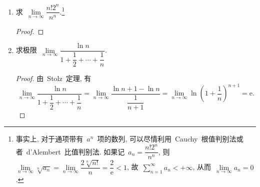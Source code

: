 \documentclass[UTF8,a4paper,11pt,twoside]{book}
\newcommand{\e}{\mathrm e}
\begin{document}
\begin{enumerate}
\begin{proof}
		      由于~$\lim\limits_{n\to\infty} \left(1+\dfrac{1}{n+1}\right)^n=\lim\limits_{n\to\infty} \left(1+\dfrac{1}{n}\right)^{n+1}=\e$, 即对于任意给定的~$\varepsilon>0$, 存在~$N\in\mathbf{N}_{+}$, 使得当~$n>N$~时有
		      \[
			      \left|\left(1+\dfrac{1}{n+1}\right)^n-\e\right|<\varepsilon \ \text{且}\ \left|\left(1+\dfrac{1}{n}\right)^{n+1}-\e\right|<\varepsilon.
		      \]
		      特别地, 当~$n>N$~时有
		      \[
			      \left(1+\dfrac{1}{n+1}\right)^n>\e-\varepsilon \ \text{且}\ \left(1+\dfrac{1}{n}\right)^{n+1}<\e+\varepsilon.
		      \]
		      由于~$\lim\limits_{n\to\infty} p_n=+\infty$, 对于~$N>0$, 存在~$M\in\mathbf{N}_{+}$~使得~$n>M$~时, $[p_n]>N$, 于是当~$n>M$~时, 就有
		      \[
			      \e-\varepsilon<\left(1+\dfrac{1}{[p_n]+1}\right)^{[p_n]}<\left(1+\dfrac{1}{p_n}\right)^{p_n}<\left(1+\dfrac{1}{[p_n]}\right)^{[p_n]+1}<\e+\varepsilon.
		      \]
		      即当~$n>M$~时~$\left|\left(1+\dfrac{1}{p_n}\right)^{p_n}-e\right|<\varepsilon$, 所以~$\lim\limits_{n\to\infty} \left(1+\dfrac{1}{p_n}\right)^{p_n}=\e$. \qedhere
	      \end{proof}
	\item 求~$\lim\limits_{n\to\infty} \dfrac{n!2^n}{n^n}$.\footnote{事实上, 对于通项带有~$a^n$~项的数列, 可以尽情利用~Cauchy~根值判别法或者~d'Alembert~比值判别法. 如果记~$a_n=\dfrac{n!2^n}{n^n}$, 则~$\lim\limits_{n\to\infty} \sqrt[n]{a_n}=\lim\limits_{n\to\infty} \dfrac{2\sqrt[n]{n!}}{n}=\dfrac{2}{\e}<1$, 故~$\sum\limits_{n=1}^{\infty}a_n<+\infty$, 从而~$\lim\limits_{n\to\infty} a_n=0$.}
	      \begin{proof}

	      \end{proof}
	\item 求极限~$\lim\limits_{n\to\infty} \dfrac{\ln{n}}{1+\dfrac{1}{2}+\cdots+\dfrac{1}{n}}$.
	      \begin{proof}
		      由~Stolz~定理, 有
		      \[
			      \lim\limits_{n\to\infty} \dfrac{\ln{n}}{1+\dfrac{1}{2}+\cdots+\dfrac{1}{n}}=\lim\limits_{n\to\infty} \dfrac{\ln{n+1}-\ln{n}}{\dfrac{1}{n+1}}=\lim\limits_{n\to\infty} \ln\left(1+\dfrac{1}{n}\right)^{n+1}=\e.
		      \]
	      \end{proof}


\end{enumerate}
\end{document}
